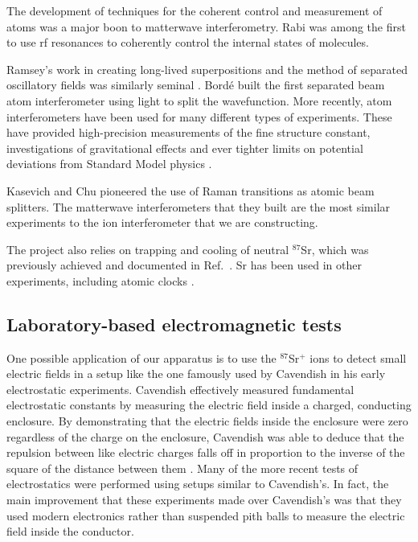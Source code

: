 The development of techniques for the coherent control and measurement of atoms was a major boon to matterwave interferometry\cite{Kronin_RMP}. Rabi was among the first to use rf resonances to coherently control the internal states of molecules\cite{RabiOriginal}\cite{Kronin_RMP}. 

Ramsey's work in creating long-lived superpositions and the method of separated oscillatory fields was similarly seminal \cite{Kronin_RMP}\cite{Ramsey_original}. 
Bord\'e built \cite{borde_interferometer} the first separated beam atom interferometer using light to split the wavefunction. 
More recently, atom interferometers have been used for many different types of experiments. These have provided high-precision measurements of the fine structure constant\cite{WichtFineStructure}\cite{WeissFineStructure}\cite{GibbleFineStructure}, investigations of gravitational effects \cite{mullerIsotropyGR}\cite{KasevichGravWaves} and ever tighter limits on potential deviations from Standard Model physics\cite{mullerLorentzInvarianceElectrodynamics}  \cite{Kronin_RMP}\cite{KasevichInertial}.

Kasevich and Chu pioneered the use of Raman transitions as atomic beam splitters\cite{kasevichChu1991}. The matterwave interferometers that they built are the most similar experiments to the ion interferometer that we are constructing. 

The project also relies on trapping and cooling of neutral $^{87}$Sr, which was previously achieved and documented in Ref.~\cite{kurosu_trap_sr}. Sr has been used in other experiments, including atomic clocks \cite{ludlow_science}.


\subsection{Laboratory-based electromagnetic tests}

One possible application of our apparatus is to use the $^{87}$Sr$^+$ ions to detect small electric fields in a setup like the one famously used by Cavendish in his early electrostatic experiments. Cavendish effectively measured fundamental electrostatic constants by measuring the electric field inside a charged, conducting enclosure. By demonstrating that the electric fields inside the enclosure were zero regardless of the charge on the enclosure, Cavendish was able to deduce that the repulsion between like electric charges falls off in proportion to the inverse of the square of the distance between them \cite{geodude}. Many of the more recent tests of electrostatics were performed using setups similar to Cavendish's\cite{jackson}.  In fact, the main improvement that these experiments made over Cavendish's was that they used modern electronics rather than suspended pith balls to measure the electric field inside the conductor.

